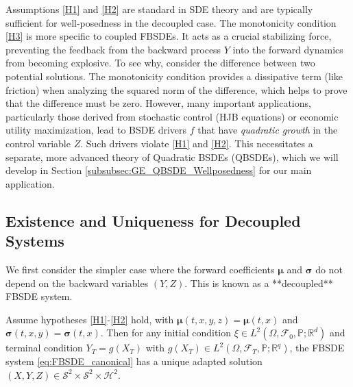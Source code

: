 \begin{remark}
Assumptions \ref{H1} and \ref{H2} are standard in SDE theory and are typically sufficient for well-posedness in the decoupled case. The monotonicity condition \ref{H3} is more specific to coupled FBSDEs. It acts as a crucial stabilizing force, preventing the feedback from the backward process \(Y\) into the forward dynamics from becoming explosive. To see why, consider the difference between two potential solutions. The monotonicity condition provides a dissipative term (like friction) when analyzing the squared norm of the difference, which helps to prove that the difference must be zero. However, many important applications, particularly those derived from stochastic control (HJB equations) or economic utility maximization, lead to BSDE drivers \(f\) that have \emph{quadratic growth} in the control variable \(Z\). Such drivers violate \ref{H1} and \ref{H2}. This necessitates a separate, more advanced theory of Quadratic BSDEs (QBSDEs), which we will develop in Section \ref{subsubsec:GE_QBSDE_Wellposedness} for our main application.
\end{remark}

\subsection{Existence and Uniqueness for Decoupled Systems}
\label{sec:decoupled}

We first consider the simpler case where the forward coefficients \(\bm\mu\) and \(\bm\sigma\) do not depend on the backward variables \((Y,Z)\). This is known as a **decoupled** FBSDE system.

\begin{theorem}
\label{thm:PP_decoupled}
Assume hypotheses \ref{H1}-\ref{H2} hold, with \(\bm\mu(t,x,y,z) = \bm\mu(t,x)\) and \(\bm\sigma(t,x,y) = \bm\sigma(t,x)\). Then for any initial condition \(\xi \in L^2(\Omega, \mathcal{F}_0, \mathbb{P}; \mathbb{R}^d)\) and terminal condition \(Y_T = g(X_T)\) with \(g(X_T) \in L^2(\Omega, \mathcal{F}_T, \mathbb{P}; \mathbb{R}^q)\), the FBSDE system \eqref{eq:FBSDE_canonical} has a unique adapted solution \((X,Y,Z)\in\mathcal S^2\times\mathcal S^2\times\mathcal H^2\).
\end{theorem}

